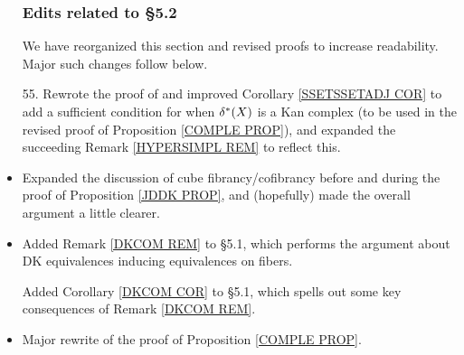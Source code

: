 \documentclass{article}
\begin{document}
\begin{itemize}
      \subsubsection*{Edits related to \S 5.2}

      We have reorganized this section and revised proofs to increase readability. Major such changes follow below.
      
\item[55.] Rewrote the proof of and improved Corollary \ref{SSETSSETADJ COR} to add a sufficient condition for when $\delta^{\**}(X)$ is a Kan complex (to be used in the revised proof of Proposition \ref{COMPLE PROP}), and expanded the succeeding Remark \ref{HYPERSIMPL REM} to reflect this.
      
\item Expanded the discussion of cube fibrancy/cofibrancy before and during the proof of Proposition \ref{JDDK PROP}, and (hopefully) made the overall argument a little clearer. %
      

      
\item Added Remark \ref{DKCOM REM} to \S 5.1, which performs the argument about DK equivalences inducing equivalences on fibers.
      
      Added Corollary \ref{DKCOM COR} to \S 5.1, which spells out some key consequences of Remark \ref{DKCOM REM}.     
      

      
\item Major rewrite of the proof of Proposition \ref{COMPLE PROP}.
      



\end{itemize}
\end{document}

